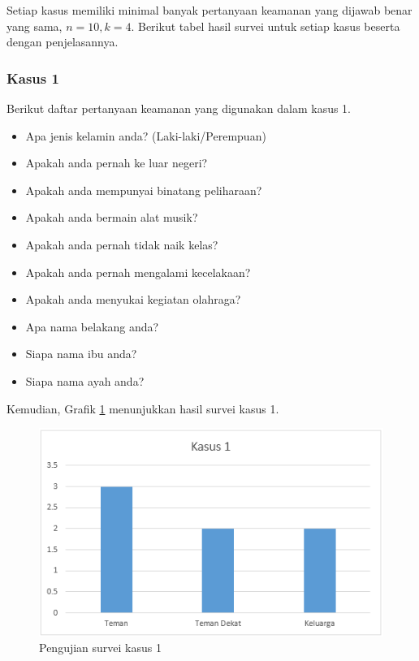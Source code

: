 Setiap kasus memiliki minimal banyak pertanyaan keamanan yang dijawab benar yang sama, \begin{math}n=10, k=4\end{math}. Berikut tabel hasil survei untuk setiap kasus beserta dengan penjelasannya.

\subsubsection{Kasus 1}

Berikut daftar pertanyaan keamanan yang digunakan dalam kasus 1.
\begin{itemize}
	\item Apa jenis kelamin anda? (Laki-laki/Perempuan)
	\item Apakah anda pernah ke luar negeri?
	\item Apakah anda mempunyai binatang peliharaan?
	\item Apakah anda bermain alat musik?
	\item Apakah anda pernah tidak naik kelas?
	\item Apakah anda pernah mengalami kecelakaan?
	\item Apakah anda menyukai kegiatan olahraga?
	\item Apa nama belakang anda?
	\item Siapa nama ibu anda?
	\item Siapa nama ayah anda?
\end{itemize}
Kemudian, Grafik \ref{fig:kasus1} menunjukkan hasil survei kasus 1.
\begin{figure}[H]
	\includegraphics[scale=0.7]{Gambar/kasus1}
	\centering
	\caption{Pengujian survei kasus 1}\label{fig:kasus1}
\end{figure}

